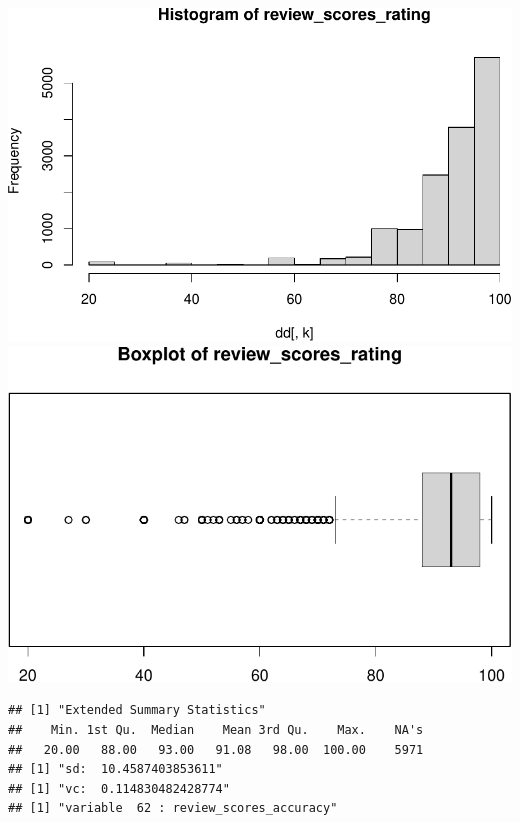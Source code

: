 \includegraphics{anal_files/figure-latex/unnamed-chunk-7-46.pdf}
\includegraphics{anal_files/figure-latex/unnamed-chunk-7-47.pdf}

\begin{verbatim}
## [1] "Extended Summary Statistics"
##    Min. 1st Qu.  Median    Mean 3rd Qu.    Max.    NA's 
##   20.00   88.00   93.00   91.08   98.00  100.00    5971 
## [1] "sd:  10.4587403853611"
## [1] "vc:  0.114830482428774"
## [1] "variable  62 : review_scores_accuracy"
\end{verbatim}

